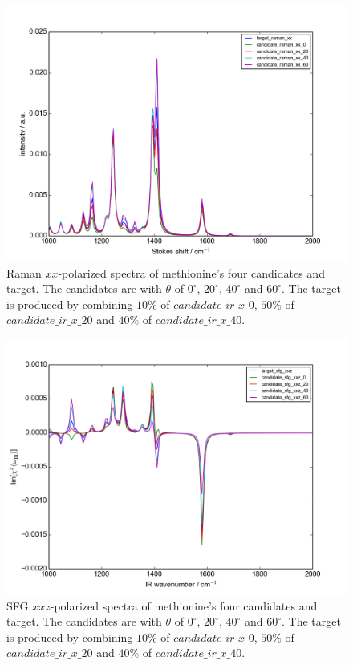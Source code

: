 \begin{figure}[!ht]
\centering
\includegraphics[scale=0.5]{Figures/Met_candidates_plotting_raman_xx.png}
\caption{Raman $xx$-polarized spectra of methionine's four candidates and target. The candidates are with $\theta$ of $0^{\circ}$, $20^{\circ}$, $40^{\circ}$ and $60^{\circ}$. The target is produced by combining $10\%$ of $candidate\_ir\_x\_0$, $50\%$ of $candidate\_ir\_x\_20$ and $40\%$ of $candidate\_ir\_x\_40$.} \label{fig:2.4}
\end{figure}

\begin{figure}[!ht]
\centering
\includegraphics[scale=0.5]{Figures/Met_candidates_plotting_sfg_xxz.png}
\caption{SFG $xxz$-polarized spectra of methionine's four candidates and target. The candidates are with $\theta$ of $0^{\circ}$, $20^{\circ}$, $40^{\circ}$ and $60^{\circ}$. The target is produced by combining $10\%$ of $candidate\_ir\_x\_0$, $50\%$ of $candidate\_ir\_x\_20$ and $40\%$ of $candidate\_ir\_x\_40$.} \label{fig:2.5}
\end{figure}

